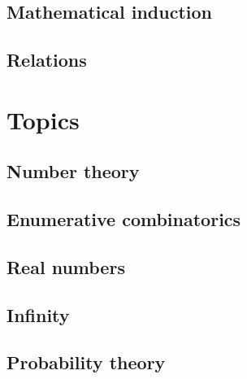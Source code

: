 \documentclass[10pt]{book}
\begin{document}
\chapter{Mathematical induction}
    \label{chMathematicalInduction}
    

\chapter{Relations}
    \label{chRelations}
    

\part{Topics}
\label{ptTopics}

\chapter{Number theory}
    \label{chNumberTheory}
    

\chapter{Enumerative combinatorics}
    \label{chCombinatorics}
    

%     
    
\chapter{Real numbers}
    \label{chRealNumbers}
    
    
\chapter{Infinity}
    \label{chInfinity}
    
    
\chapter{Probability theory}
    \label{chProbabilityTheory}
    
    
\end{document}
